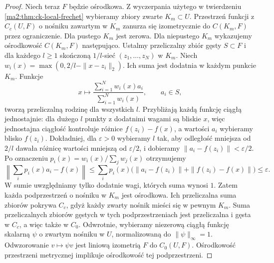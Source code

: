 \begin{proof}
Niech teraz $F$ będzie ośrodkowa.
Z wyczerpania użytego w twierdzeniu
\ref{ma2:thm:ck-local-frechet} wybieramy
zbiory zwarte $K_m\subset U$.
Przestrzeń funkcji z $C_c(U,F)$
o nośniku zawartym w $K_m$ zanurza się
izometrycznie do $C(K_m,F)$ przez
ograniczenie. Dla pustego $K_m$ jest
zerowa. Dla niepustego $K_m$ wykazujemy
ośrodkowość $C(K_m,F)$ następująco.
Ustalmy przeliczalny zbiór gęsty $S\subset F$
i dla każdego $l\ge1$ skończoną $1/l$-sieć
$(z_1,\ldots,z_N)$ w $K_m$.
Niech $w_i(x)=\max(0,2/l-\|x-z_i\|_2)$.
Ich suma jest dodatnia w każdym punkcie
$K_m$. Funkcje
\[
 x\longmapsto\frac{\sum_{i=1}^N w_i(x)a_i}
                         {\sum_{i=1}^N w_i(x)},
 \qquad a_i\in S,
\]
tworzą przeliczalną rodzinę dla wszystkich
$l$. Przybliżają każdą funkcję ciągłą
jednostajnie: dla dużego $l$ punkty
z dodatnimi wagami są bliskie $x$,
więc jednostajna ciągłość kontroluje
różnice $f(z_i)-f(x)$, a wartości $a_i$
wybieramy blisko $f(z_i)$. Dokładniej, dla $\varepsilon>0$
wybieramy $l$ tak, aby odległość mniejsza
od $2/l$ dawała różnicę wartości mniejszą
od $\varepsilon/2$, i dobieramy
$\|a_i-f(z_i)\|<\varepsilon/2$.
Po oznaczeniu $p_i(x)=w_i(x)/\sum_jw_j(x)$
otrzymujemy
\[
 \left\|\sum_i p_i(x)a_i-f(x)\right\|
 \le \sum_i p_i(x)\bigl(\|a_i-f(z_i)\|
              +\|f(z_i)-f(x)\|\bigr)
 \le\varepsilon.
\]
W sumie uwzględniamy tylko dodatnie wagi,
których suma wynosi $1$.
Zatem każda podprzestrzeń o nośniku
w $K_m$ jest ośrodkowa. Ich przeliczalna
suma zbiorów pokrywa $C_c$, gdyż każdy
zwarty nośnik mieści się w pewnym $K_m$.
Suma przeliczalnych zbiorów gęstych
w tych podprzestrzeniach jest przeliczalna
i gęsta w $C_c$, a więc także w $C_0$.
Odwrotnie, wybieramy niezerową ciągłą
funkcję skalarną $\psi$ o zwartym nośniku
w $U$, normalizowaną do $\|\psi\|_\infty=1$.
Odwzorowanie $v\mapsto\psi v$ jest
liniową izometrią $F$ do $C_0(U,F)$.
Ośrodkowość przestrzeni metrycznej
implikuje ośrodkowość tej podprzestrzeni.
\end{proof}

